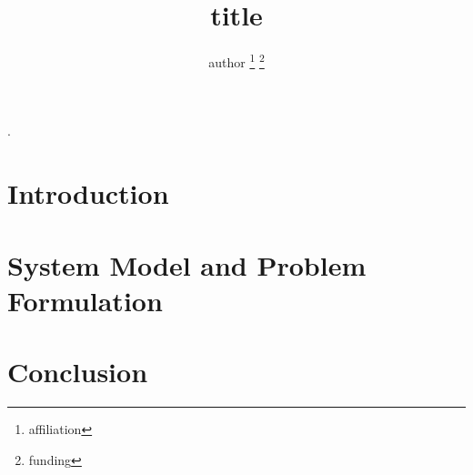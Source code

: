 \documentclass[12pt,english,draftclsnofoot,onecolumn]{IEEEtran} %
\title{{{title}}}
\author{{{author}}
	\thanks{{{affiliation}}}
	\thanks{{{funding}}}
}
\begin{document}
\maketitle

\begin{abstract}\noindent
	\textcolor{blue}{\blindtext}
\end{abstract}
\begin{IEEEkeywords}
	.
\end{IEEEkeywords}
\glsresetall

\section{Introduction}\label{sec:introduction}

\section{System Model and Problem Formulation}\label{sec:system-model}


\blinddocument


\section{Conclusion}\label{sec:conclusion}

\printbibliography
\end{document}
